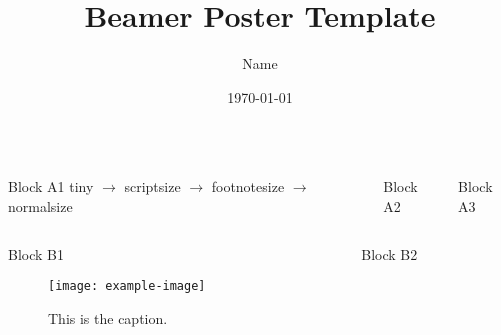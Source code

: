 \documentclass{beamer}
\title[beamer poster template]{Beamer Poster Template}
\author[name]{Name}
\institute[affiliation]{Affiliation}
\date{\today}
\begin{document}
  \begin{frame}{} 
	\vspace{-0cm}
	\begin{beamercolorbox}{}
	\maketitle
	\end{beamercolorbox}
	\vskip 2cm
	
	\begin{block}{}
	\blindtext
	\end{block}
	
	\begin{columns}[t]
   	\begin{column}{0.33\linewidth}
     		\begin{block}{\veryHuge Block A1}
     		\centering
      	{\tiny tiny} $\rightarrow$
      	{\scriptsize scriptsize} $\rightarrow$
      	{\footnotesize footnotesize} $\rightarrow$
     		{\normalsize normalsize}
     		 \vspace{6cm}
     		\end{block}
		\end{column}
		\begin{column}{0.33\linewidth}
     		\begin{block}{\VeryHuge Block A2}
     		 \vspace{8cm}
     		\end{block}
		\end{column}
		\begin{column}{0.33\linewidth}
     		\begin{block}{\VERYHuge Block A3}
     		\centering
     		 \vspace{10cm}
     		\end{block}
		\end{column}
	\end{columns}
 
 	\vfill
 
 	\begin{columns}[t]
 		\begin{column}{0.5\linewidth}
 			\begin{block}{\large Block B1}
 				\begin{figure}[h!]
 					\texttt{[image: example-image]}
 					\caption{This is the caption.}
				\end{figure}
     		\end{block}
		\end{column}
		\begin{column}{0.5\linewidth}
 			\begin{block}{\Large Block B2}
 			\blindtext
 			 \vspace{6cm}
     		\end{block}
		\end{column}
 	\end{columns}
 	

\end{frame}
\end{document}
